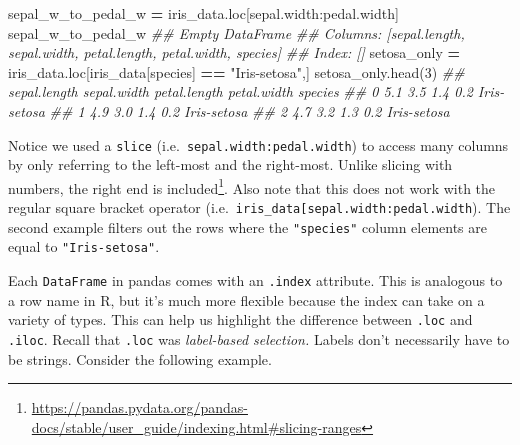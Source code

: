 \documentclass[
  12pt,
]{krantz}
\makeatletter
\newenvironment{Shaded}{\begin{snugshade}}{\end{snugshade}}
\newcommand{\CommentTok}[1]{\textcolor[rgb]{0.37,0.37,0.37}{\textit{#1}}}
\newcommand{\DecValTok}[1]{\textcolor[rgb]{0.06,0.06,0.06}{#1}}
\newcommand{\NormalTok}[1]{#1}
\newcommand{\OperatorTok}[1]{\textcolor[rgb]{0.43,0.43,0.43}{\textbf{#1}}}
\newcommand{\StringTok}[1]{\textcolor[rgb]{0.5,0.5,0.5}{#1}}
\renewcommand{\href}[2]{#2\footnote{\url{#1}}}
\newenvironment{kframe}{%
\medskip{}
\setlength{\fboxsep}{.8em}
 \def\at@end@of@kframe{}%
 \ifinner\ifhmode%
  \def\at@end@of@kframe{\end{minipage}}%
  \begin{minipage}{\columnwidth}%
 \fi\fi%
 \def\FrameCommand##1{\hskip\@totalleftmargin \hskip-\fboxsep
 \colorbox{shadecolor}{##1}\hskip-\fboxsep
     \hskip-\linewidth \hskip-\@totalleftmargin \hskip\columnwidth}%
 \MakeFramed {\advance\hsize-\width
   \@totalleftmargin\z@ \linewidth\hsize
   \@setminipage}}%
 {\par\unskip\endMakeFramed%
 \at@end@of@kframe}
\renewenvironment{Shaded}{\begin{kframe}}{\end{kframe}}
\makeatother
\begin{document}
\begin{Shaded}
\begin{Highlighting}[]
\NormalTok{sepal\_w\_to\_pedal\_w }\OperatorTok{=}\NormalTok{ iris\_data.loc[}\StringTok{\textquotesingle{}sepal.width\textquotesingle{}}\NormalTok{:}\StringTok{\textquotesingle{}pedal.width\textquotesingle{}}\NormalTok{]}
\NormalTok{sepal\_w\_to\_pedal\_w}
\CommentTok{\#\# Empty DataFrame}
\CommentTok{\#\# Columns: [sepal.length, sepal.width, petal.length, petal.width, species]}
\CommentTok{\#\# Index: []}
\NormalTok{setosa\_only }\OperatorTok{=}\NormalTok{ iris\_data.loc[iris\_data[}\StringTok{\textquotesingle{}species\textquotesingle{}}\NormalTok{] }\OperatorTok{==} \StringTok{"Iris{-}setosa"}\NormalTok{,]}
\NormalTok{setosa\_only.head(}\DecValTok{3}\NormalTok{)}
\CommentTok{\#\#    sepal.length  sepal.width  petal.length  petal.width      species}
\CommentTok{\#\# 0           5.1          3.5           1.4          0.2  Iris{-}setosa}
\CommentTok{\#\# 1           4.9          3.0           1.4          0.2  Iris{-}setosa}
\CommentTok{\#\# 2           4.7          3.2           1.3          0.2  Iris{-}setosa}
\end{Highlighting}
\end{Shaded}

Notice we used a \texttt{slice} (i.e.~\texttt{\textquotesingle{}sepal.width\textquotesingle{}:\textquotesingle{}pedal.width\textquotesingle{}}) to access many columns by only referring to the left-most and the right-most. Unlike slicing with numbers, \href{https://pandas.pydata.org/pandas-docs/stable/user_guide/indexing.html\#slicing-ranges}{the right end is included}. Also note that this does not work with the regular square bracket operator (i.e.~\texttt{iris\_data{[}\textquotesingle{}sepal.width\textquotesingle{}:\textquotesingle{}pedal.width\textquotesingle{}{]}}). The second example filters out the rows where the \texttt{"species"} column elements are equal to \texttt{"Iris-setosa"}.

Each \texttt{DataFrame} in pandas comes with an \texttt{.index} attribute. This is analogous to a row name in R, but it's much more flexible because the index can take on a variety of types. This can help us highlight the difference between \texttt{.loc} and \texttt{.iloc}. Recall that \texttt{.loc} was \emph{label-based selection.} Labels don't necessarily have to be strings. Consider the following example.
\end{document}
